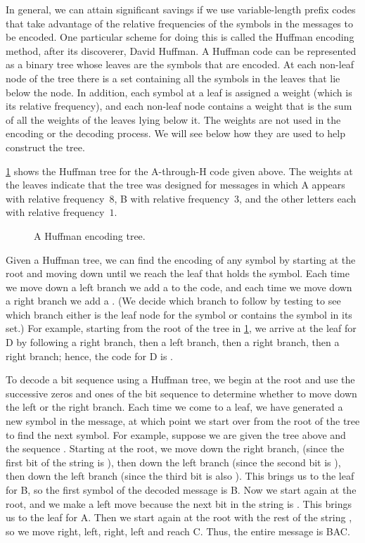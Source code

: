 In general, we can attain significant savings if we use variable-length prefix codes that take advantage of the relative frequencies of the symbols in the messages to be encoded.
One particular scheme for doing this is called the Huffman encoding method, after its discoverer, David Huffman.
A Huffman code can be represented as a binary tree whose leaves are the symbols that are encoded.
At each non-leaf node of the tree there is a set containing all the symbols in the leaves that lie below the node.
In addition, each symbol at a leaf is assigned a weight (which is its relative frequency), and each non-leaf node contains a weight that is the sum of all the weights of the leaves lying below it.
The weights are not used in the encoding or the decoding process.
We will see below how they are used to help construct the tree.

\cref{Figure 2.18} shows the Huffman tree for the A-through-H code given above.
The weights at the leaves indicate that the tree was designed for messages in which A appears with relative frequency~\( 8 \), B with relative frequency~\( 3 \), and the other letters each with relative frequency~\( 1 \).

\begin{figure}[tb]
	\centering
	
	\caption{
		A Huffman encoding tree.
	}
	\label{Figure 2.18}
\end{figure}

Given a Huffman tree, we can find the encoding of any symbol by starting at the root and moving down until we reach the leaf that holds the symbol.
Each time we move down a left branch we add a  to the code, and each time we move down a right branch we add a .
(We decide which branch to follow by testing to see which branch either is the leaf node for the symbol or contains the symbol in its set.)
For example, starting from the root of the tree in \cref{Figure 2.18}, we arrive at the leaf for D by following a right branch, then a left branch, then a right branch, then a right branch;
hence, the code for D is .

To decode a bit sequence using a Huffman tree, we begin at the root and use the successive zeros and ones of the bit sequence to determine whether to move down the left or the right branch.
Each time we come to a leaf, we have generated a new symbol in the message, at which point we start over from the root of the tree to find the next symbol.
For example, suppose we are given the tree above and the sequence .
Starting at the root, we move down the right branch, (since the first bit of the string is ), then down the left branch (since the second bit is ), then down the left branch (since the third bit is also ).
This brings us to the leaf for B, so the first symbol of the decoded message is B.
Now we start again at the root, and we make a left move because the next bit in the string is .
This brings us to the leaf for A.
Then we start again at the root with the rest of the string , so we move right, left, right, left and reach C.
Thus, the entire message is BAC.



